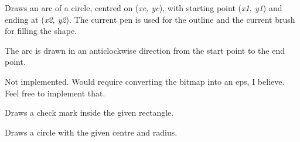 \label{wxlatexdcdrawarc}


Draws an arc of a circle, centred on ({\it xc, yc}), with starting point ({\it x1, y1})
and ending at ({\it x2, y2}).   The current pen is used for the outline
and the current brush for filling the shape.

The arc is drawn in an anticlockwise direction from the start point to the end point.

\label{wxlatexdcdrawbitmap}





Not implemented. Would require converting the bitmap into an eps, I believe.
Feel free to implement that.

\label{wxlatexdcdrawcheckmark}



Draws a check mark inside the given rectangle.

\label{wxlatexdcdrawcircle}



Draws a circle with the given centre and radius.

